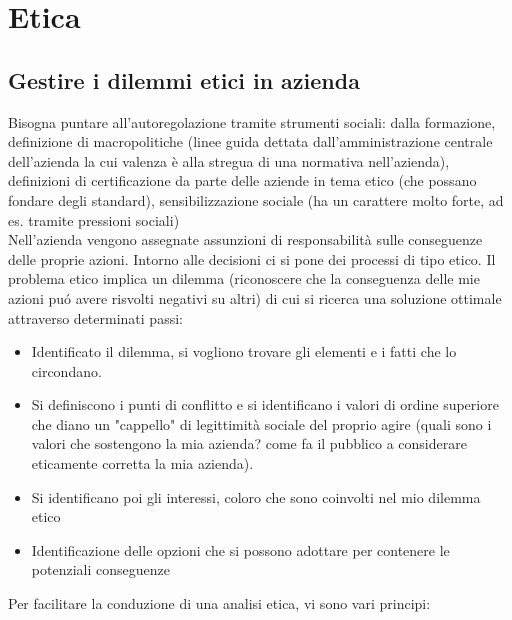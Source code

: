 \chapter{Etica}

\section{Gestire i dilemmi etici in azienda}
Bisogna puntare all'autoregolazione tramite strumenti sociali: dalla
formazione, definizione di macropolitiche (linee guida dettata
dall'amministrazione centrale dell'azienda la cui valenza \`e alla stregua
di una normativa nell'azienda), definizioni di certificazione da parte
delle aziende in tema etico (che possano fondare degli standard),
sensibilizzazione sociale (ha un carattere molto forte, ad es. tramite
pressioni sociali)\\
Nell'azienda vengono assegnate assunzioni di responsabilit\`a sulle
conseguenze delle proprie azioni. Intorno alle decisioni ci si pone dei
processi di tipo etico. Il problema etico implica un dilemma
(riconoscere che la conseguenza delle mie azioni pu\'o avere risvolti
negativi su altri) di cui si ricerca una soluzione ottimale attraverso
determinati passi:

\begin{itemize}

\item
  Identificato il dilemma, si vogliono trovare gli elementi e i fatti
  che lo circondano.\\
\item
  Si definiscono i punti di conflitto e si identificano i valori di
  ordine superiore che diano un "cappello" di legittimit\`a sociale del
  proprio agire (quali sono i valori che sostengono la mia azienda? come
  fa il pubblico a considerare eticamente corretta la mia azienda).\\
\item
  Si identificano poi gli interessi, coloro che sono coinvolti nel mio
  dilemma etico\\
\item
  Identificazione delle opzioni che si possono adottare per contenere le
  potenziali conseguenze
\end{itemize}

Per facilitare la conduzione di una analisi etica, vi sono vari
principi:

